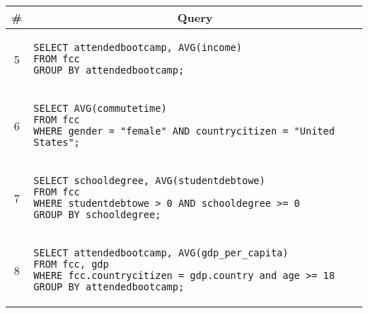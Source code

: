 \begin{tabular}{cl}
\toprule
\# & \multicolumn{1}{c}{Query} \\
\midrule
5 & 
\begin{minipage}{6in}
\begin{lstlisting}[breaklines]
SELECT attendedbootcamp, AVG(income)
FROM fcc
GROUP BY attendedbootcamp;
\end{lstlisting}
\end{minipage}{queryno} \label[query]{q5} \\
6 & 
\begin{minipage}{6in}
\begin{lstlisting}[breaklines]
SELECT AVG(commutetime)
FROM fcc
WHERE gender = "female" AND countrycitizen = "United States";
\end{lstlisting}
\end{minipage}{queryno} \label[query]{q6} \\
7 & 
\begin{minipage}{6in}
\begin{lstlisting}[breaklines]
SELECT schooldegree, AVG(studentdebtowe)
FROM fcc
WHERE studentdebtowe > 0 AND schooldegree >= 0
GROUP BY schooldegree;
\end{lstlisting}
\end{minipage}{queryno} \label[query]{q7}\\
8 & 
\begin{minipage}{6in}
\begin{lstlisting}[breaklines]
SELECT attendedbootcamp, AVG(gdp_per_capita)
FROM fcc, gdp
WHERE fcc.countrycitizen = gdp.country and age >= 18
GROUP BY attendedbootcamp;
\end{lstlisting}
\end{minipage}{queryno} \label[query]{q8}\\
\bottomrule
\end{tabular}
